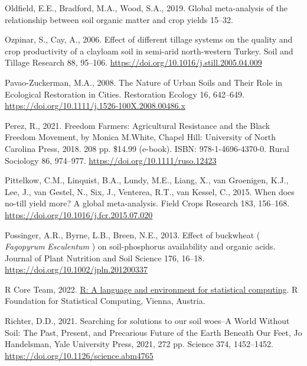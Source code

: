 \documentclass[
  12pt,
]{article}
\newlength{\cslhangindent}
\newlength{\cslentryspacingunit} %
\newenvironment{CSLReferences}[2] %
 {%
  \setlength{\parindent}{0pt}
  \ifodd #1
  \let\oldpar\par
  \def\par{\hangindent=\cslhangindent\oldpar}
  \fi
  \setlength{\parskip}{#2\cslentryspacingunit}
 }%
 {}
\begin{document}
\begin{CSLReferences}{1}{0}
\leavevmode{}%
Oldfield, E.E., Bradford, M.A., Wood, S.A., 2019. Global meta-analysis of the relationship between soil organic matter and crop yields 15--32.

\leavevmode{}%
Ozpinar, S., Cay, A., 2006. Effect of different tillage systems on the quality and crop productivity of a clay\textendash loam soil in semi-arid north-western {Turkey}. Soil and Tillage Research 88, 95--106. \url{https://doi.org/10.1016/j.still.2005.04.009}

\leavevmode{}%
Pavao-Zuckerman, M.A., 2008. The {Nature} of {Urban Soils} and {Their Role} in {Ecological Restoration} in {Cities}. Restoration Ecology 16, 642--649. \url{https://doi.org/10.1111/j.1526-100X.2008.00486.x}

\leavevmode{}%
Perez, R., 2021. Freedom {Farmers}: {Agricultural Resistance} and the {Black Freedom Movement}, by {Monica M}.{White}, {Chapel Hill}: {University} of {North Carolina Press}, 2018. 208 pp. \$14.99 (e-book). {ISBN}: 978-1-4696-4370-0. Rural Sociology 86, 974--977. \url{https://doi.org/10.1111/ruso.12423}

\leavevmode{}%
Pittelkow, C.M., Linquist, B.A., Lundy, M.E., Liang, X., van Groenigen, K.J., Lee, J., van Gestel, N., Six, J., Venterea, R.T., van Kessel, C., 2015. When does no-till yield more? {A} global meta-analysis. Field Crops Research 183, 156--168. \url{https://doi.org/10.1016/j.fcr.2015.07.020}

\leavevmode{}%
Possinger, A.R., Byrne, L.B., Breen, N.E., 2013. Effect of buckwheat ( {\emph{Fagopyrum}}{ \emph{Esculentum}} ) on soil-phosphorus availability and organic acids. Journal of Plant Nutrition and Soil Science 176, 16--18. \url{https://doi.org/10.1002/jpln.201200337}

\leavevmode{}%
R Core Team, 2022. \href{https://www.R-project.org/}{R: A language and environment for statistical computing}. R Foundation for Statistical Computing, Vienna, Austria.

\leavevmode{}%
Richter, D.D., 2021. Searching for solutions to our soil woes--{A World Without Soil}: {The Past}, {Present}, and {Precarious Future} of the {Earth Beneath Our Feet}, {Jo Handelsman}, {Yale University Press}, 2021, 272 pp. Science 374, 1452--1452. \url{https://doi.org/10.1126/science.abm4765}


\end{CSLReferences}
\end{document}
